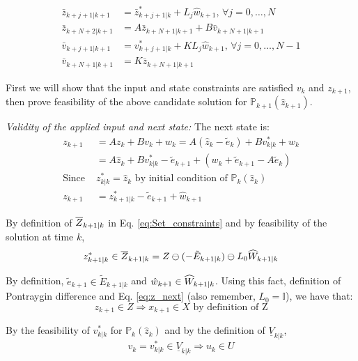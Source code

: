 \begin{subequations}
\begin{align}
\label{eq:candidate}
\bar{z}_{k+j+1|k+1} &= \bar{z}^{*}_{k+j+1|k} + L_j\hat{w}_{k+1}, \, \forall j =0,\dotsc,N \\
\bar{z}_{k+N+2|k+1}&= A\bar{z}_{k+N+1|k+1} + B\bar{v}_{k+N+1|k+1} \\
\bar{v}_{k+j+1|k+1}&=v^{*}_{k+j+1|k} + KL_j\hat{w}_{k+1}, \, \forall j =0,\dotsc,N-1 \\
\bar{v}_{k+N+1|k+1}&=K\bar{z}_{k+N+1|k+1} 
\end{align}
\end{subequations}

First we will show that the input and state constraints are satisfied $v_k$ and $z_{k+1}$, then prove feasibility of the above candidate solution for $\mathbb{P}_{k+1}(\hat{z}_{k+1})$.

\textit{Validity of the applied input and next state:}
The next state is:
\begin{subequations}
\begin{align}
\label{eq:z_next}
z_{k+1} &= Az_k + Bv_k + w_k = A(\hat{z}_k-\tilde{e}_k)+Bv^{*}_{k|k}+w_k \\
 &= A\hat{z}_k+Bv^{*}_{k|k}-\tilde{e}_{k+1}+(w_k+\tilde{e}_{k+1}-A\tilde{e}_k) \\
\text{Since }& z^{*}_{k|k}=\hat{z}_k \text{ by initial condition of } \mathbb{P}_{k}(\hat{z}_k) \nonumber \\
z_{k+1}&= z^{*}_{k+1|k} - \tilde{e}_{k+1} + \hat{w}_{k+1}
\end{align}
\end{subequations}

By definition of $\overline{Z}_{k+1|k}$ in Eq. \ref{eq:Set_constraints} and by feasibility of the solution at time $k$,
\begin{equation}
z^{*}_{k+1|k} \in\overline{Z}_{k+1|k} = Z \ominus (-\tilde{E}_{k+1|k}) \ominus L_0\widehat{W}_{k+1|k}
\end{equation}

By definition, $\tilde{e}_{k+1} \in \tilde{E}_{k+1|k}$ and $\hat{w}_{k+1} \in  \widehat{W}_{k+1|k}$. Using this fact, definition of Pontraygin difference and Eq. \ref{eq:z_next} (also remember, $L_0 = \mathbb{I}$), we have that:
\begin{equation}
z_{k+1}\in Z \Rightarrow x_{k+1} \in X \text{ by definition of Z}
\end{equation}

By the feasibility of $v^{*}_{k|k}$ for $\mathbb{P}_{k}(\hat{z}_k)$ and by the definition of $\underline{V}_{k|k}$,
\begin{equation}
v_k = v^{*}_{k|k} \in \underline{V}_{k|k} \Rightarrow u_k \in U
\end{equation}

